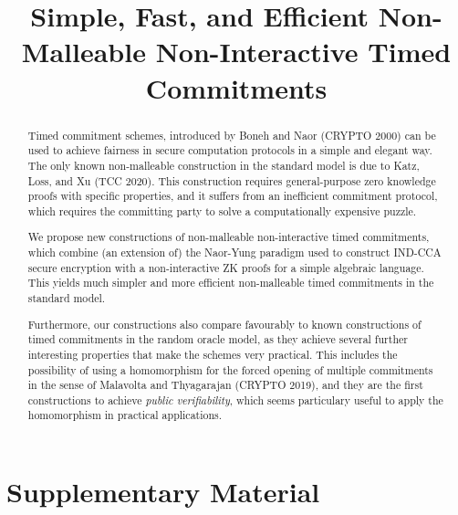 \documentclass{llncs}
\author{\vspace{-5mm}}
\institute{\vspace{-5mm}}
\begin{document}
\title{Simple, Fast, and Efficient Non-Malleable Non-Interactive Timed Commitments}


\maketitle
\begin{abstract}
Timed commitment schemes, introduced by Boneh and Naor (CRYPTO 2000) can be used to achieve fairness in secure computation protocols in a simple and elegant way.
The only known non-malleable construction in the standard model is due to Katz, Loss, and Xu (TCC 2020). This construction requires general-purpose zero knowledge proofs with specific properties, and it suffers from an inefficient commitment protocol, which requires the committing party to solve a computationally expensive puzzle.

We propose new constructions of non-malleable non-interactive timed commitments, which combine (an extension of) the Naor-Yung paradigm used to construct IND-CCA secure encryption with a non-interactive ZK proofs for a simple algebraic language. This yields much simpler and more efficient non-malleable timed commitments in the standard model.

Furthermore, our constructions also compare favourably to known constructions of timed commitments in the random oracle model, as they achieve several further interesting properties that make the schemes very practical. This includes the possibility of using a homomorphism for the forced opening of multiple commitments in the sense of Malavolta and Thyagarajan (CRYPTO 2019), and they are the first constructions to achieve \emph{public verifiability}, which seems particulary useful to apply the homomorphism in practical applications.
\end{abstract}


















\appendix
\chapter*{Supplementary Material}
%



\end{document}
